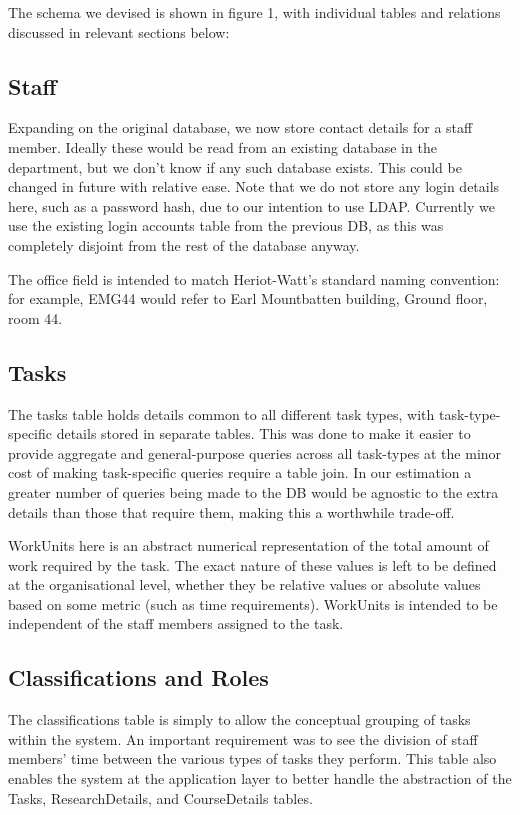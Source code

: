 \documentclass[11pt, a4paper]{article}
\begin{document}
The schema we devised is shown in figure 1, with individual tables and relations discussed in relevant sections below:

\subsection{Staff}
Expanding on the original database, we now store contact details for a staff member. Ideally these would be read from an existing database in the department, but we don’t know if any such database exists. This could be changed in future with relative ease. Note that we do not store any login details here, such as a password hash, due to our intention to use LDAP. Currently we use the existing login accounts table from the previous DB, as this was completely disjoint from the rest of the database anyway.

The office field is intended to match Heriot-Watt’s standard naming convention: for example, EMG44 would refer to Earl Mountbatten building, Ground floor, room 44.

\subsection{Tasks}
The tasks table holds details common to all different task types, with task-type-specific details stored in separate tables. This was done to make it easier to provide aggregate and general-purpose queries across all task-types at the minor cost of making task-specific queries require a table join. In our estimation a greater number of queries being made to the DB would be agnostic to the extra details than those that require them, making this a worthwhile trade-off.

WorkUnits here is an abstract numerical representation of the total amount of work required by the task. The exact nature of these values is left to be defined at the organisational level, whether they be relative values or absolute values based on some metric (such as time requirements). WorkUnits is intended to be independent of the staff members assigned to the task.

\subsection{Classifications and Roles}
The classifications table is simply to allow the conceptual grouping of tasks within the system. An important requirement was to see the division of staff members’ time between the various types of tasks they perform. This table also enables the system at the application layer to better handle the abstraction of the Tasks, ResearchDetails, and CourseDetails tables.
\end{document}

